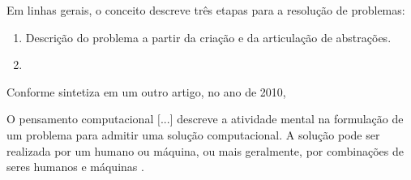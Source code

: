




Em linhas gerais, o conceito descreve três etapas para a resolução de problemas:

\begin{enumerate}
  \item Descrição do problema a partir da criação e da articulação de abstrações.
  \item 

\end{enumerate}




Conforme sintetiza em um outro artigo, no ano de 2010,






\begin{citacao}
  O pensamento computacional $[$...$]$ descreve a atividade mental na formulação de um problema para admitir 
uma solução computacional. A solução pode ser realizada por um humano ou máquina, 
ou mais geralmente, por combinações de seres humanos e máquinas \cite[tradução nossa]{Wing2010}.
\end{citacao}




